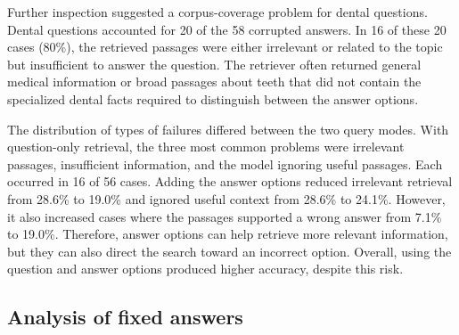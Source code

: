 \documentclass{article}
\begin{document}
Further inspection suggested a corpus-coverage problem for dental questions.
Dental questions accounted for 20 of the 58 corrupted answers. In 16 of these
20 cases (80\%), the retrieved passages were either irrelevant or related to the
topic but insufficient to answer the question. The retriever often returned
general medical information or broad passages about teeth that did not contain
the specialized dental facts required to distinguish between the answer options.

The distribution of types of failures differed between the two query modes. With question-only
retrieval, the three most common problems were irrelevant passages, insufficient
information, and the model ignoring useful passages. Each occurred in 16 of 56
cases. Adding the answer options reduced irrelevant retrieval from
28.6\% to 19.0\% and ignored useful context from 28.6\% to 24.1\%. However, it
also increased cases where the passages supported a wrong answer from 7.1\% to
19.0\%. Therefore, answer options can help retrieve more relevant information,
but they can also direct the search toward an incorrect option. Overall, using
the question and answer options produced higher accuracy, despite this risk.

\subsection{Analysis of fixed answers}

\begin{table}[!htb]
\centering
\small
\setlength{\tabcolsep}{3pt}
\caption{Primary reasons assigned to fixed answers in the two 500-question
experiments at $k=15$.}
\label{tab:fixed-analysis}
\end{table}
\end{document}
